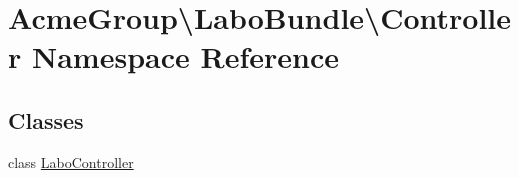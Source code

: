 \hypertarget{namespace_acme_group_1_1_labo_bundle_1_1_controller}{\section{Acme\+Group\textbackslash{}Labo\+Bundle\textbackslash{}Controller Namespace Reference}
\label{namespace_acme_group_1_1_labo_bundle_1_1_controller}
}
\subsection*{Classes}
\begin{DoxyCompactItemize}
\item 
class \hyperlink{class_acme_group_1_1_labo_bundle_1_1_controller_1_1_labo_controller}{Labo\+Controller}
\end{DoxyCompactItemize}
